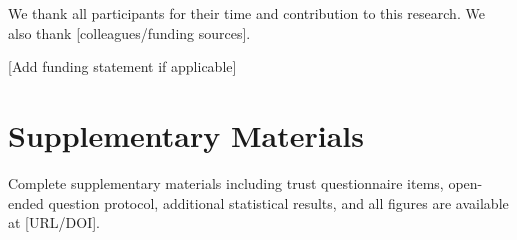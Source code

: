 \documentclass[12pt]{article}
\begin{document}
We thank all participants for their time and contribution to this research. We also thank [colleagues/funding sources].

[Add funding statement if applicable]



\newpage
\appendix

\section{Supplementary Materials}

Complete supplementary materials including trust questionnaire items, open-ended question protocol, additional statistical results, and all figures are available at [URL/DOI].
\end{document}
